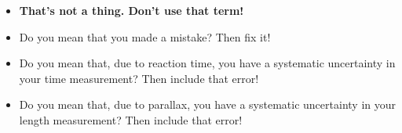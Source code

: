 \documentclass[aspectratio=169,
hyperref={colorlinks,urlcolor=blue}
]{beamer}
\begin{document}

{
\begin{itemize}
\item \textbf{That’s not a thing. Don’t use that term!}
\item Do you mean that you made a mistake? Then fix it!
\item Do you mean that, due to reaction time, you have a systematic uncertainty in your time measurement? Then include that error!
\item Do you mean that, due to parallax, you have a systematic uncertainty in your length measurement? Then include that error!
\end{itemize}
}
{
}





\end{document}
